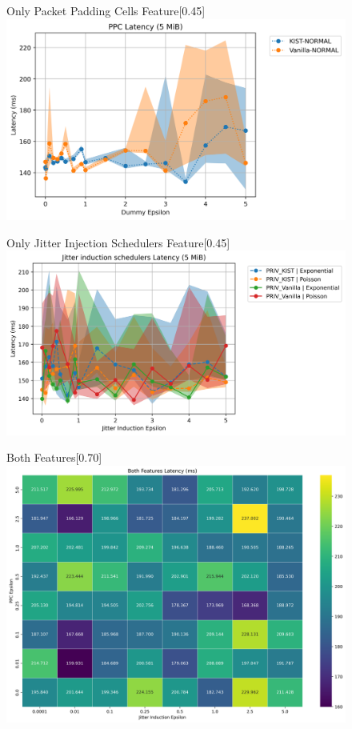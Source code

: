 \begin{figure}[htbp]
    \centering
    \begin{subcaptionbox}{Only Packet Padding Cells Feature\label{fig:dist_ppc_latency}}[0.45\textwidth]
        {\includegraphics[width=\linewidth]{Chapters/Figures/Plots/dist_latency_50_PPC_5mib.png}}
    \end{subcaptionbox}
    \hfill
    \begin{subcaptionbox}{Only Jitter Injection Schedulers Feature\label{fig:dist_jitter_latency}}[0.45\textwidth]
        {\includegraphics[width=\linewidth]{Chapters/Figures/Plots/dist_latency_50_jitter_5mib.png}}
    \end{subcaptionbox}
    \vfill
    \begin{subcaptionbox}{Both Features\label{fig:dist_both_latency}}[0.70\textwidth]
        {\includegraphics[width=\linewidth]{Chapters/Figures/Plots/dist_latency_50_heatmap_5mib.png}}

\end{subcaptionbox}
\end{figure}
